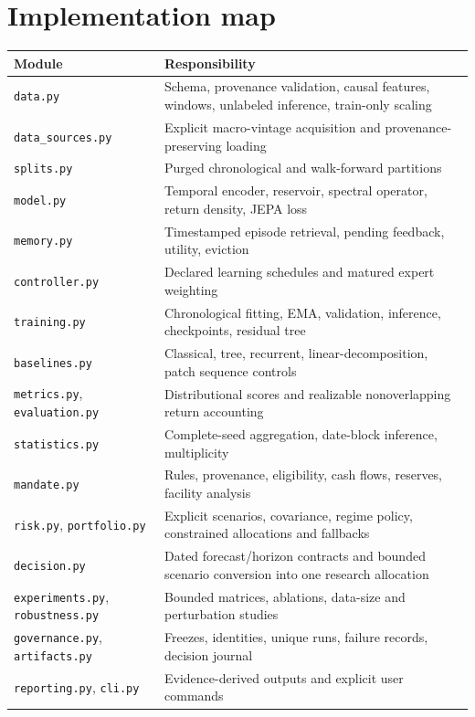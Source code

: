 \documentclass[11pt,a4paper]{article}
\begin{document}
\section{Implementation map}
\begin{longtable}{>{\raggedright\arraybackslash}p{.32\linewidth}>{\raggedright\arraybackslash}p{.59\linewidth}}
\toprule Module & Responsibility \\
\midrule\endhead
\texttt{data.py} & Schema, provenance validation, causal features, windows, unlabeled inference, train-only scaling \\
\texttt{data\_sources.py} & Explicit macro-vintage acquisition and provenance-preserving loading \\
\texttt{splits.py} & Purged chronological and walk-forward partitions \\
\texttt{model.py} & Temporal encoder, reservoir, spectral operator, return density, JEPA loss \\
\texttt{memory.py} & Timestamped episode retrieval, pending feedback, utility, eviction \\
\texttt{controller.py} & Declared learning schedules and matured expert weighting \\
\texttt{training.py} & Chronological fitting, EMA, validation, inference, checkpoints, residual tree \\
\texttt{baselines.py} & Classical, tree, recurrent, linear-decomposition, patch sequence controls \\
\texttt{metrics.py}, \texttt{evaluation.py} & Distributional scores and realizable nonoverlapping return accounting \\
\texttt{statistics.py} & Complete-seed aggregation, date-block inference, multiplicity \\
\texttt{mandate.py} & Rules, provenance, eligibility, cash flows, reserves, facility analysis \\
\texttt{risk.py}, \texttt{portfolio.py} & Explicit scenarios, covariance, regime policy, constrained allocations and fallbacks \\
\texttt{decision.py} & Dated forecast/horizon contracts and bounded scenario conversion into one research allocation \\
\texttt{experiments.py}, \texttt{robustness.py} & Bounded matrices, ablations, data-size and perturbation studies \\
\texttt{governance.py}, \texttt{artifacts.py} & Freezes, identities, unique runs, failure records, decision journal \\
\texttt{reporting.py}, \texttt{cli.py} & Evidence-derived outputs and explicit user commands \\
\bottomrule
\end{longtable}
\end{document}
